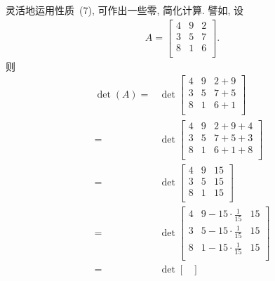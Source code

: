\documentclass[%
    UTF8,%
    fontset=none,%
    punct=kaiming,%
    zihao=-4,%
    a4paper,%
    oneside,%
]{ctexbook}
\begin{document}
\begin{example}
    灵活地运用性质~(7), 可作出一些零, 简化计算.
    譬如,
    设
    \begin{align*}
        A = \begin{bmatrix}
                4 & 9 & 2 \\
                3 & 5 & 7 \\
                8 & 1 & 6 \\
            \end{bmatrix}.
    \end{align*}
    则
    \begin{align*}
        \det {(A)}
        = {} &
        \det {
            \begin{bmatrix}
                4 & 9 & 2 + 9 \\
                3 & 5 & 7 + 5 \\
                8 & 1 & 6 + 1 \\
            \end{bmatrix}
        }
        \\
        = {} &
        \det {
            \begin{bmatrix}
                4 & 9 & 2 + 9 + 4 \\
                3 & 5 & 7 + 5 + 3 \\
                8 & 1 & 6 + 1 + 8 \\
            \end{bmatrix}
        }
        \\
        = {} &
        \det {
            \begin{bmatrix}
                4 & 9 & 15 \\
                3 & 5 & 15 \\
                8 & 1 & 15 \\
            \end{bmatrix}
        }
        \\
        = {} &
        \det {
            \begin{bmatrix}
                4 & 9 - 15 \cdot \frac{1}{15} & 15 \\
                3 & 5 - 15 \cdot \frac{1}{15} & 15 \\
                8 & 1 - 15 \cdot \frac{1}{15} & 15 \\
            \end{bmatrix}
        }
        \\
        = {} &
        \det {
            \begin{bmatrix}

\end{bmatrix}}
\end{align*}
\end{example}
\end{document}
